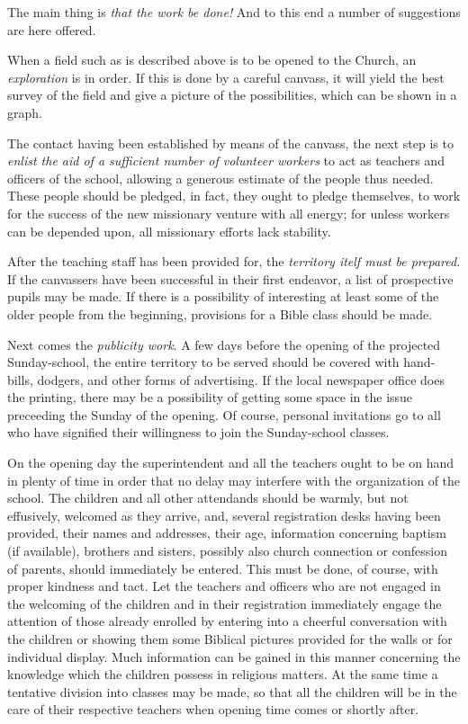 \documentclass[
]{book}
\begin{document}
The main thing is \emph{that the work be done!} And to this end a number of suggestions are here offered.

When a field such as is described above is to be opened to the Church, an \emph{exploration} is in order. If this is done by a careful canvass, it will yield the best survey of the field and give a picture of the possibilities, which can be shown in a graph.

The contact having been established by means of the canvass, the next step is to \emph{enlist the aid of a sufficient number of volunteer workers} to act as teachers and officers of the school, allowing a generous estimate of the people thus needed. These people should be pledged, in fact, they ought to pledge themselves, to work for the success of the new missionary venture with all energy; for unless workers can be depended upon, all missionary efforts lack stability.

After the teaching staff has been provided for, the \emph{territory itelf must be prepared}. If the canvassers have been successful in their first endeavor, a list of prospective pupils may be made. If there is a possibility of interesting at least some of the older people from the beginning, provisions for a Bible class should be made.

Next comes the \emph{publicity work}. A few days before the opening of the projected Sunday-school, the entire territory to be served should be covered with hand-bills, dodgers, and other forms of advertising. If the local newspaper office does the printing, there may be a possibility of getting some space in the issue preceeding the Sunday of the opening. Of course, personal invitations go to all who have signified their willingness to join the Sunday-school classes.

On the opening day the superintendent and all the teachers ought to be on hand in plenty of time in order that no delay may interfere with the organization of the school. The children and all other attendands should be warmly, but not effusively, welcomed as they arrive, and, several registration desks having been provided, their names and addresses, their age, information concerning baptism (if available), brothers and sisters, possibly also church connection or confession of parents, should immediately be entered. This must be done, of course, with proper kindness and tact. Let the teachers and officers who are not engaged in the welcoming of the children and in their registration immediately engage the attention of those already enrolled by entering into a cheerful conversation with the children or showing them some Biblical pictures provided for the walls or for individual display. Much information can be gained in this manner concerning the knowledge which the children possess in religious matters. At the same time a tentative division into classes may be made, so that all the children will be in the care of their respective teachers when opening time comes or shortly after.
\end{document}
